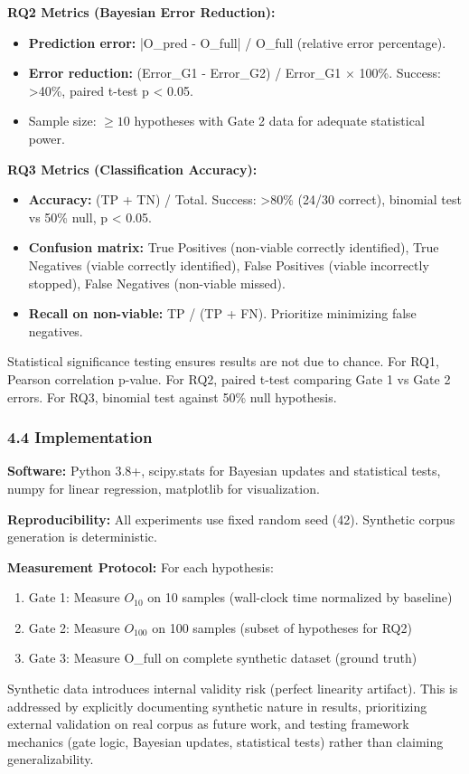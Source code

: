 \textbf{RQ2 Metrics (Bayesian Error Reduction):}
\begin{itemize}
\item \textbf{Prediction error:} |O\_pred - O\_full| / O\_full (relative error percentage).
\item \textbf{Error reduction:} (Error\_G1 - Error\_G2) / Error\_G1 $\times$ 100\%. Success: >40\%, paired t-test p < 0.05.
\item Sample size: $\geq 10$ hypotheses with Gate 2 data for adequate statistical power.
\end{itemize}

\textbf{RQ3 Metrics (Classification Accuracy):}
\begin{itemize}
\item \textbf{Accuracy:} (TP + TN) / Total. Success: >80\% (24/30 correct), binomial test vs 50\% null, p < 0.05.
\item \textbf{Confusion matrix:} True Positives (non-viable correctly identified), True Negatives (viable correctly identified), False Positives (viable incorrectly stopped), False Negatives (non-viable missed).
\item \textbf{Recall on non-viable:} TP / (TP + FN). Prioritize minimizing false negatives.
\end{itemize}

Statistical significance testing ensures results are not due to chance. For RQ1, Pearson correlation p-value. For RQ2, paired t-test comparing Gate 1 vs Gate 2 errors. For RQ3, binomial test against 50\% null hypothesis.

\subsubsection{4.4 Implementation}

\textbf{Software:} Python 3.8+, scipy.stats for Bayesian updates and statistical tests, numpy for linear regression, matplotlib for visualization.

\textbf{Reproducibility:} All experiments use fixed random seed (42). Synthetic corpus generation is deterministic.

\textbf{Measurement Protocol:} For each hypothesis:
\begin{enumerate}
\item Gate 1: Measure $O_{10}$ on 10 samples (wall-clock time normalized by baseline)
\item Gate 2: Measure $O_{100}$ on 100 samples (subset of hypotheses for RQ2)
\item Gate 3: Measure O\_full on complete synthetic dataset (ground truth)
\end{enumerate}

Synthetic data introduces internal validity risk (perfect linearity artifact). This is addressed by explicitly documenting synthetic nature in results, prioritizing external validation on real corpus as future work, and testing framework mechanics (gate logic, Bayesian updates, statistical tests) rather than claiming generalizability.
